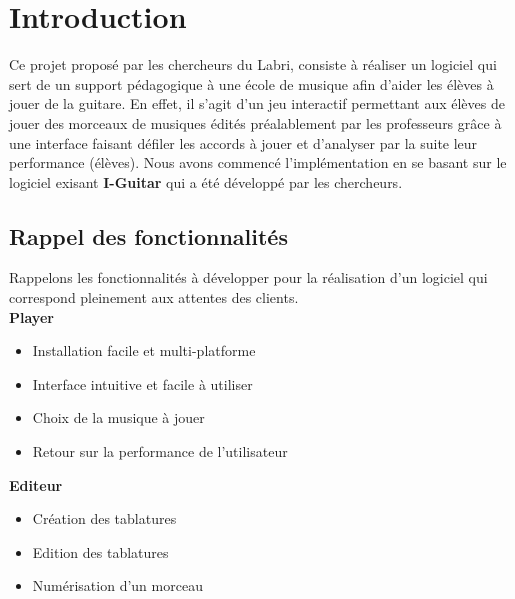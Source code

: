 \chapter{Introduction}
Ce projet proposé par les chercheurs du Labri, consiste à réaliser un logiciel qui sert de un support pédagogique à une école de musique afin d'aider les élèves à jouer de la guitare. En effet, il s'agit d'un jeu interactif permettant aux élèves de jouer des morceaux de musiques édités préalablement par les professeurs grâce à une interface faisant défiler les accords à jouer et d'analyser par la suite leur performance (élèves). Nous avons commencé l'implémentation en se basant sur le logiciel exisant \textbf{I-Guitar} qui a été développé par les chercheurs.

\section{Rappel des fonctionnalités}
Rappelons les fonctionnalités à développer pour la réalisation d'un logiciel qui correspond pleinement aux attentes des clients.\\

\textbf{Player}
\begin{itemize}
\item Installation facile et multi-platforme
\item Interface intuitive et facile à utiliser
\item Choix de la musique à jouer
\item Retour sur la performance de l'utilisateur
\end{itemize}

\textbf{Editeur}
\begin{itemize}
\item Création des tablatures 
\item Edition des tablatures
\item Numérisation d'un morceau
\end{itemize}
